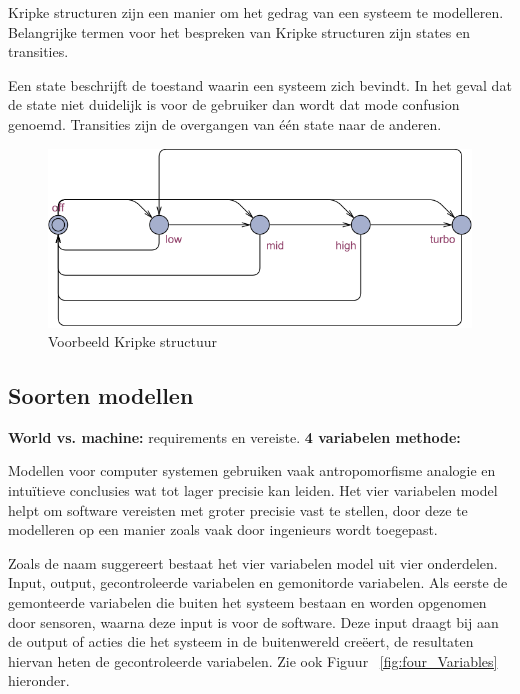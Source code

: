 \documentclass{article}
\begin{document}
Kripke structuren zijn een manier om het gedrag van een systeem te modelleren. Belangrijke termen voor het bespreken van Kripke structuren zijn states en transities. \newline

Een state beschrijft de toestand waarin een systeem zich bevindt. In het geval dat de state niet duidelijk is voor de gebruiker dan wordt dat mode confusion genoemd. Transities zijn de overgangen van één state naar de anderen. 

\begin{figure}[!h]
	\centering
	\includegraphics[width=\textwidth]{kripke_structure_example1}
    \caption{Voorbeeld Kripke structuur}
\end{figure}

\subsection{Soorten modellen}

\textbf{World vs. machine:}
requirements en vereiste. \newline \newline
\textbf{4 variabelen methode:}

Modellen voor computer systemen gebruiken vaak antropomorfisme analogie en intuïtieve conclusies wat tot lager precisie kan leiden. Het vier variabelen model helpt om software vereisten met groter precisie vast te stellen, door deze te modelleren op een manier zoals vaak door ingenieurs wordt toegepast. \cite{parnas1995functional} 

Zoals de naam suggereert bestaat het vier variabelen model uit vier onderdelen. Input, output, gecontroleerde variabelen en gemonitorde variabelen. Als eerste de gemonteerde variabelen die buiten het systeem bestaan en worden opgenomen door sensoren, waarna deze input is voor de software. Deze input draagt bij aan de output of acties die het systeem in de buitenwereld creëert, de resultaten hiervan heten de gecontroleerde variabelen. Zie ook Figuur ~\ref{fig:four_Variables} hieronder.
\end{document}
